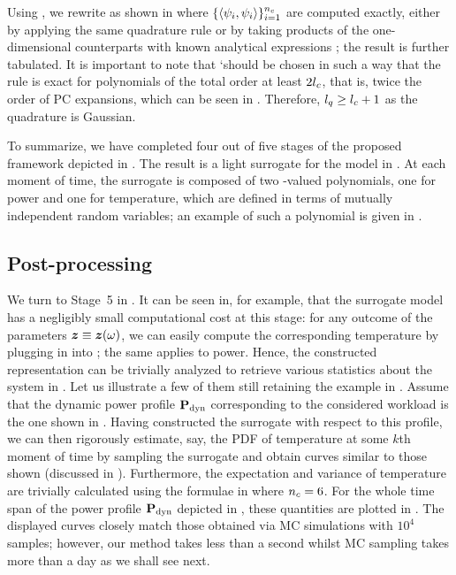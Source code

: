 Using , we rewrite  as shown in
 where $\{ \left\langle \psi_i, \psi_i \right\rangle \}_{i
= 1}^{n_{c}}$ are computed exactly, either by applying the same quadrature rule or
by taking products of the one-dimensional counterparts with known analytical
expressions \cite{xiu2010}; the result is further tabulated. It is important to
note that \lq should be chosen in such a way that the rule is exact for
polynomials of the total order at least $2 {l_{c}}$, that is, twice the order of PC
expansions, which can be seen in  \cite{eldred2008}.
Therefore, ${l_{q}} \geq {l_{c}} + 1$ as the quadrature is Gaussian.

To summarize, we have completed four out of five stages of the proposed
framework depicted in . The result is a light surrogate for the
model in . At each moment of time, the surrogate is
composed of two \np-valued polynomials, one for power and one for temperature,
which are defined in terms of \nz mutually independent random variables; an
example of such a polynomial is given in .

\subsection{Post-processing}

We turn to Stage~5 in . It can be seen in, for example,
 that the surrogate model has a negligibly small computational
cost at this stage: for any outcome of the parameters $\boldsymbol{z} \equiv \boldsymbol{z}(\omega)$,
we can easily compute the corresponding temperature by plugging in \vz into
; the same applies to power. Hence, the constructed
representation can be trivially analyzed to retrieve various statistics about
the system in . Let us illustrate a few of them still
retaining the example in . Assume that the dynamic power
profile $\mathbf{P}_{\mathrm{dyn}}$ corresponding to the considered workload is the one shown
in . Having constructed the surrogate with respect to
this profile, we can then rigorously estimate, say, the PDF of temperature at
some $k$th moment of time by sampling the surrogate and obtain curves similar to
those shown  (discussed in
). Furthermore, the expectation and variance of
temperature are trivially calculated using the formulae in 
where ${n_{c}} = 6$. For the whole time span of the power profile $\mathbf{P}_{\mathrm{dyn}}$
depicted in , these quantities are plotted in
. The displayed curves closely match those
obtained via MC simulations with $10^4$ samples; however, our method takes less
than a second whilst MC sampling takes more than a day as we shall see next.

